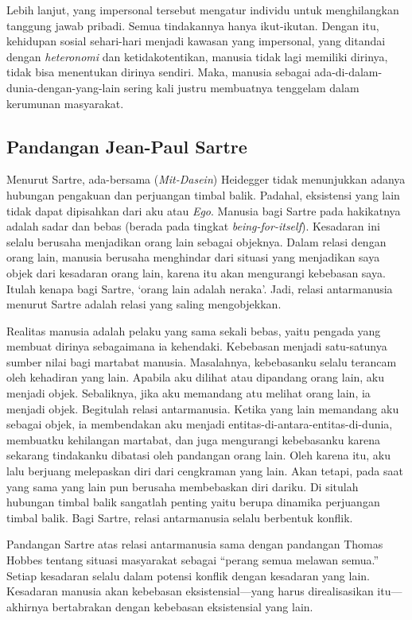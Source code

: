 \documentclass[11pt,twoside,a5paper,openany]{memoir}
\begin{document}
Lebih lanjut, yang impersonal tersebut mengatur individu untuk
menghilangkan tanggung jawab pribadi. Semua tindakannya hanya
ikut-ikutan. Dengan itu, kehidupan sosial sehari-hari menjadi kawasan
yang impersonal, yang ditandai dengan \emph{heteronomi} dan
ketidakotentikan, manusia tidak lagi memiliki dirinya, tidak bisa
menentukan dirinya sendiri. Maka, manusia sebagai
ada-di-dalam-dunia-dengan-yang-lain sering kali justru membuatnya
tenggelam dalam kerumunan masyarakat.

\hypertarget{pandangan-jean-paul-sartre}{%
\subsection{Pandangan Jean-Paul
Sartre}\label{pandangan-jean-paul-sartre}}

Menurut Sartre, ada-bersama (\emph{Mit-Dasein}) Heidegger tidak
menunjukkan adanya hubungan pengakuan dan perjuangan timbal balik.
Padahal, eksistensi yang lain tidak dapat dipisahkan dari aku atau
\emph{Ego}. Manusia bagi Sartre pada hakikatnya adalah sadar dan bebas
(berada pada tingkat \emph{being-for-itself}). Kesadaran ini selalu
berusaha menjadikan orang lain sebagai objeknya. Dalam relasi dengan
orang lain, manusia berusaha menghindar dari situasi yang menjadikan
saya objek dari kesadaran orang lain, karena itu akan mengurangi
kebebasan saya. Itulah kenapa bagi Sartre, `orang lain adalah neraka'.
Jadi, relasi antarmanusia menurut Sartre adalah relasi yang saling
mengobjekkan.

Realitas manusia adalah pelaku yang sama sekali bebas, yaitu pengada
yang membuat dirinya sebagaimana ia kehendaki. Kebebasan menjadi
satu-satunya sumber nilai bagi martabat manusia. Masalahnya, kebebasanku
selalu terancam oleh kehadiran yang lain. Apabila aku dilihat atau
dipandang orang lain, aku menjadi objek. Sebaliknya, jika aku memandang
atu melihat orang lain, ia menjadi objek. Begitulah relasi antarmanusia.
Ketika yang lain memandang aku sebagai objek, ia membendakan aku menjadi
entitas-di-antara-entitas-di-dunia, membuatku kehilangan martabat, dan
juga mengurangi kebebasanku karena sekarang tindakanku dibatasi oleh
pandangan orang lain. Oleh karena itu, aku lalu berjuang melepaskan diri
dari cengkraman yang lain. Akan tetapi, pada saat yang sama yang lain
pun berusaha membebaskan diri dariku. Di situlah hubungan timbal balik
sangatlah penting yaitu berupa dinamika perjuangan timbal balik. Bagi
Sartre, relasi antarmanusia selalu berbentuk konflik.

Pandangan Sartre atas relasi antarmanusia sama dengan pandangan Thomas
Hobbes tentang situasi masyarakat sebagai ``perang semua melawan
semua.'' Setiap kesadaran selalu dalam potensi konflik dengan kesadaran
yang lain. Kesadaran manusia akan kebebasan eksistensial---yang harus
direalisasikan itu---akhirnya bertabrakan dengan kebebasan eksistensial
yang lain.
\end{document}
